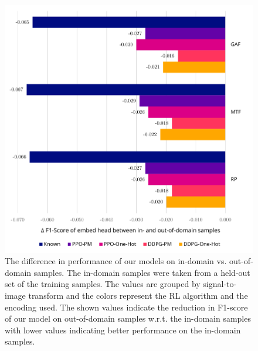 \begin{figure}
	\centering
	\includegraphics[width=6in]{figures/results_domains}
	\caption{The difference in performance of our models on in-domain vs. out-of-domain samples. The in-domain samples were taken from a held-out set of the training samples. The values are grouped by signal-to-image transform and the colors represent the RL algorithm and the encoding used. The shown values indicate the reduction in F1-score of our model on out-of-domain samples w.r.t. the in-domain samples with lower values indicating better performance on the in-domain samples.}
	\label{fig:results-domains}
\end{figure}
	
